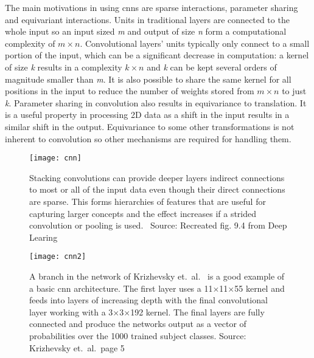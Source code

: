 The main motivations in using \ac{cnn}s are sparse interactions, parameter sharing
and equivariant interactions. Units in traditional layers are connected to the whole
input so an input sized \textit{m} and output of size \textit{n} form a computational
complexity of $m \times n$. Convolutional layers' units typically only connect to a small
portion of the input, which can be a significant decrease in computation: a kernel of
size \textit{k} results in a complexity $k \times n$ and \textit{k} can be kept several
orders of magnitude smaller than \textit{m}. It is also possible to share the same kernel
for all positions in the input to reduce the number of weights stored from $m \times n$
to just \textit{k}. Parameter sharing in convolution also results in equivariance to
translation. It is a useful property in processing 2D data as a shift in the input
results in a similar shift in the output. Equivariance to some other transformations is not
inherent to convolution so other mechanisms are required for handling them.

\begin{figure}[H]
\centering
\texttt{[image: cnn]}
\caption{Stacking convolutions can provide deeper layers indirect connections to
         most or all of the input data even though their direct connections are sparse.
         This forms hierarchies of features that are useful for capturing larger concepts
         and the effect increases if a strided convolution or pooling is used.~\cite{DEEP_LEARNING}
         Source: Recreated fig. 9.4 from Deep Learing~\cite{DEEP_LEARNING}}\label{fig:scon}
\end{figure}

\begin{figure}[H]
\centering
\texttt{[image: cnn2]}
\caption{A branch in the network of Krizhevsky et.~al.~\cite{NIPS_IMAGENET} is a good example
         of a basic \ac{cnn} architecture. The first layer uses a 11$\times$11$\times$55
         kernel and feeds into layers of increasing depth with the final convolutional layer
         working with a 3$\times$3$\times$192 kernel. The final layers are fully connected
         and produce the networks output as a vector of probabilities over the 1000 trained
         subject classes. Source: Krizhevsky et.~al.~page 5~\cite{NIPS_IMAGENET}}\label{fig:cnn}
\end{figure}

